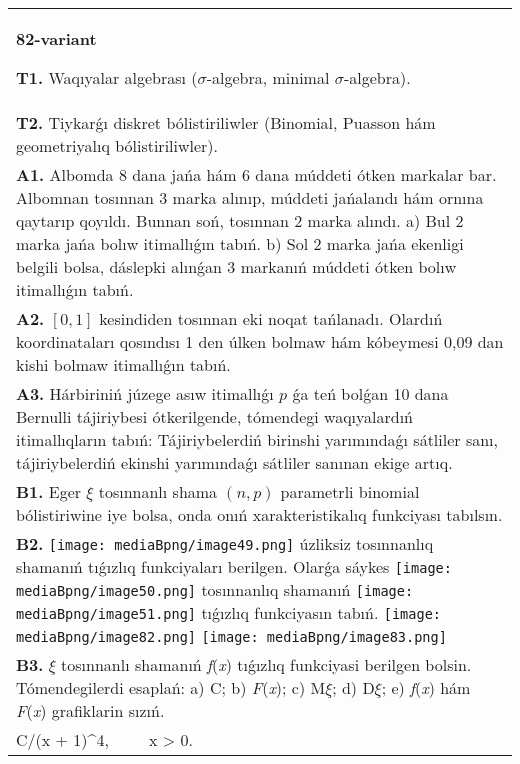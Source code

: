 \documentclass{article}
\begin{document}
\begin{tabular}{m{17cm}}
\textbf{82-variant}
\newline

\textbf{T1.} Waqıyalar algebrası ($\sigma$-algebra, minimal $\sigma$-algebra).
 \\
\textbf{T2.} Tiykarǵı diskret bólistiriliwler (Binomial, Puasson hám geometriyalıq bólistiriliwler).
 \\
\textbf{A1.} Albomda 8 dana jańa hám 6 dana múddeti ótken markalar bar. Albomnan tosınnan 3 marka alınıp, múddeti jańalandı hám ornına qaytarıp qoyıldı. Bunnan soń, tosınnan 2 marka alındı. a) Bul 2 marka jańa bolıw itimallıǵın tabıń. b) Sol 2 marka jańa ekenligi belgili bolsa, dáslepki alınǵan 3 markanıń múddeti ótken bolıw itimallıǵın tabıń.
 \\
\textbf{A2.} $\left[ 0,1 \right]$ kesindiden tosınnan eki noqat tańlanadı. Olardıń koordinataları qosındısı 1 den úlken bolmaw hám kóbeymesi 0,09 dan kishi bolmaw itimallıǵın tabıń.
 \\
\textbf{A3.} Hárbiriniń júzege asıw itimallıǵı $p$ ǵa teń bolǵan 10 dana Bernulli tájiriybesi ótkerilgende, tómendegi waqıyalardıń itimallıqların tabıń: Tájiriybelerdiń birinshi yarımındaǵı sátliler sanı, tájiriybelerdiń ekinshi yarımındaǵı sátliler sanınan ekige artıq.
 \\
\textbf{B1.} Eger \(\xi\) tosınnanlı shama \((n,p)\) parametrli binomial bólistiriwine iye bolsa, onda onıń xarakteristikalıq funkciyası tabılsın.
 \\
\textbf{B2.} \texttt{[image: mediaBpng/image49.png]} úzliksiz tosınnanlıq shamanıń tıǵızlıq funkciyaları berilgen. Olarǵa sáykes \texttt{[image: mediaBpng/image50.png]} tosınnanlıq shamanıń \texttt{[image: mediaBpng/image51.png]} tıǵızlıq funkciyasın tabıń. \texttt{[image: mediaBpng/image82.png]} \texttt{[image: mediaBpng/image83.png]}
 \\
\textbf{B3.} $\xi$ tosınnanlı shamanıń \emph{f}(\emph{x}) tıǵızlıq funkciyasi berilgen bolsin. Tómendegilerdi esaplań: a) C; b) \emph{F}(\emph{x}); c) M$\xi$; d) D$\xi$; e) \emph{f}(\emph{x}) hám \emph{F}(\emph{x}) grafiklarin sızıń.\(f(x) = \left\{ \begin{matrix}
\ \ \ \ \ \ \ \ 0,\ \ \ \ \ \ \ \ \ \ \ \ x \leq 0, \\
C/(x + 1)^{4},\ \ \ \ \ x > 0.\ \ 
\end{matrix} \right.\ \)

\end{tabular}
\end{document}
